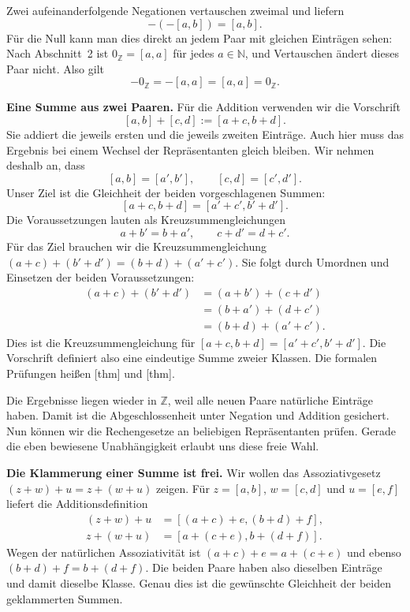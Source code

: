 Zwei aufeinanderfolgende Negationen vertauschen zweimal und liefern
\[
  -(-[a,b])=[a,b].
\]
Für die Null kann man dies direkt an jedem Paar mit gleichen
Einträgen sehen: Nach Abschnitt~2 ist \(0_{\mathbb Z}=[a,a]\)
für jedes \(a\in\mathbb N\), und Vertauschen ändert dieses Paar
nicht. Also gilt
\[
  -0_{\mathbb Z}=-[a,a]=[a,a]=0_{\mathbb Z}.
\]

\medskip\noindent\textbf{Eine Summe aus zwei Paaren.}
Für die Addition verwenden wir die Vorschrift
\[
  [a,b]+[c,d]:=[a+c,b+d].
\]
Sie addiert die jeweils ersten und die jeweils zweiten Einträge.
Auch hier muss das Ergebnis bei einem Wechsel der Repräsentanten
gleich bleiben. Wir nehmen deshalb an, dass
\[
  [a,b]=[a',b'],\qquad [c,d]=[c',d'].
\]
Unser Ziel ist die Gleichheit der beiden vorgeschlagenen Summen:
\[
  [a+c,b+d]=[a'+c',b'+d'].
\]
Die Voraussetzungen lauten als Kreuzsummengleichungen
\[
  a+b'=b+a',
  \qquad c+d'=d+c'.
\]
Für das Ziel brauchen wir die Kreuzsummengleichung
\((a+c)+(b'+d')=(b+d)+(a'+c')\). Sie folgt durch Umordnen
und Einsetzen der beiden Voraussetzungen:
\[
  \begin{aligned}
    (a+c)+(b'+d')
      &=(a+b')+(c+d')\\
      &=(b+a')+(d+c')\\
      &=(b+d)+(a'+c').
  \end{aligned}
\]
Dies ist die Kreuzsummengleichung für
\([a+c,b+d]=[a'+c',b'+d']\).
Die Vorschrift definiert also eine eindeutige Summe zweier Klassen.
Die formalen Prüfungen heißen
[thm] und
[thm].

Die Ergebnisse liegen wieder in \(\mathbb Z\), weil alle neuen
Paare natürliche Einträge haben. Damit ist die Abgeschlossenheit
unter Negation und Addition gesichert. Nun können wir die
Rechengesetze an beliebigen Repräsentanten prüfen. Gerade die eben
bewiesene Unabhängigkeit erlaubt uns diese freie Wahl.

\medskip\noindent\textbf{Die Klammerung einer Summe ist frei.}
Wir wollen das Assoziativgesetz
\((z+w)+u=z+(w+u)\) zeigen. Für \(z=[a,b]\),
\(w=[c,d]\) und \(u=[e,f]\) liefert die Additionsdefinition
\[
  \begin{aligned}
    (z+w)+u&=[(a+c)+e,(b+d)+f],\\
    z+(w+u)&=[a+(c+e),b+(d+f)].
  \end{aligned}
\]
Wegen der natürlichen Assoziativität ist
\((a+c)+e=a+(c+e)\) und ebenso \((b+d)+f=b+(d+f)\).
Die beiden Paare haben also dieselben Einträge und damit dieselbe
Klasse. Genau dies ist die gewünschte Gleichheit der beiden
geklammerten Summen.

